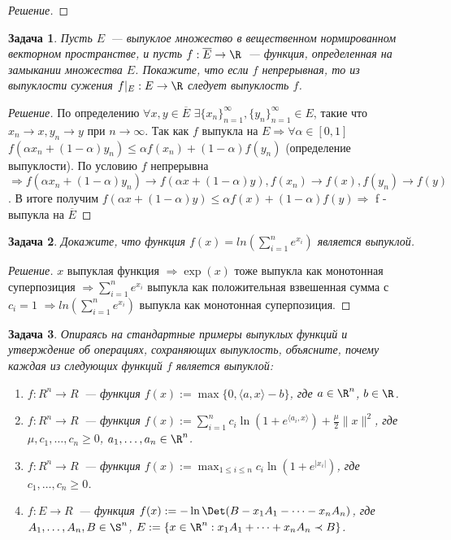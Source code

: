 \documentclass[a4paper]{article}
\newtheorem{problem}{Задача}
\begin{document}
\begin{proof}[Решение]
\end{proof}

\begin{problem}
Пусть $E$~--- выпуклое множество в вещественном нормированном векторном пространстве, и пусть $f : \overline{E} \to \R$~--- функция, определенная на замыкании множества $E$. Покажите, что если $f$ непрерывная, то из выпуклости сужения $f \vert_E : E \to \R$ следует выпуклость $f$.
\end{problem}

\begin{proof}[Решение]
По определению $\forall x, y\in  \overline{E}$ $ \exists \{x_n\}_{n=1}^{\infty}, \{y_n\}_{n=1}^{\infty} \in E$, такие что $x_n \rightarrow x, y_n \rightarrow y$ при $n\xrightarrow{}\infty$.
Так как $f$ выпукла на $E \Rightarrow\forall \alpha \in [0, 1]$ $f(\alpha x_n + (1 - \alpha) y_n)\leq \alpha f(x_n) + (1 - \alpha)f(y_n)$ (определение выпуклости). По условию $f$ непрерывна $ \Rightarrow f(\alpha x_n + (1 - \alpha) y_n) \xrightarrow{} f(\alpha x + (1 - \alpha) y), f(x_n) \xrightarrow{} f(x), f(y_n) \xrightarrow{} f(y)$. В итоге получим $f(\alpha x + (1 - \alpha) y)\leq \alpha f(x) + (1 - \alpha)f(y) \Rightarrow$ f - выпукла на $\overline{E}$
\end{proof}

\begin{problem}
Докажите, что функция $f(x) = ln(\sum_{i = 1}^n e^{x_i})$ является выпуклой.
\end{problem}

\begin{proof}[Решение]
$x$ выпуклая функция $\Rightarrow \exp(x)$ тоже выпукла как монотонная суперпозиция $\Rightarrow \sum_{i = 1}^n e^{x_i}$ выпукла как положительная взвешенная сумма с $c_i = 1$ $\Rightarrow ln(\sum_{i = 1}^n e^{x_i})$ выпукла как монотонная суперпозиция.
\end{proof}

\begin{problem}
Опираясь на стандартные примеры выпуклых функций и утверждение об операциях, сохраняющих выпуклость, объясните, почему каждая из следующих функций $f$ является выпуклой:
\begin{enumerate}[label=(\alph*)]
    \item $f : R^n \to R$~--- функция $f(x) := \max\{ 0, \langle a, x \rangle - b \}$, где $a \in \R^n$, $b \in \R$.
    \item $f : R^n \to R$~--- функция $f(x) := \sum_{i=1}^n c_i \ln(1 + e^{\langle a_i, x \rangle}) + \frac{\mu}{2} \| x \|^2$, где $\mu, c_1, \dots, c_n \geq 0$, $a_1, \dots, a_n \in \R^n$.
    \item $f : R^n \to R$~--- функция $f(x) := \max_{1 \leq i \leq n} c_i \ln( 1 + e^{|x_i|} )$, где $c_1, \dots, c_n \geq 0$.
    \item $f : E \to R$~--- функция $f(x) := -\ln \Det( B - x_1 A_1 - \dots - x_n A_n )$, где $A_1, \dots, A_n, B \in \S^n$, $E := \{ x \in \R^n : x_1 A_1 + \dots + x_n A_n \prec B \}$.
\end{enumerate}
\end{problem}
\end{document}
